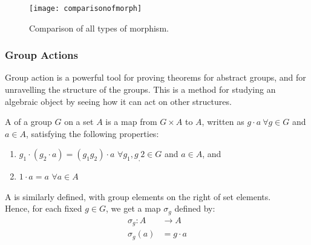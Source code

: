 \begin{figure}[H]
\centering
\texttt{[image: comparisonofmorph]}
\caption{Comparison of all types of morphism.}
\end{figure}

\subsubsection{Group Actions}

Group action is a powerful tool for proving theorems for abstract groups, and for unravelling the structure of the groups. This is a method for studying an algebraic object by seeing how it can act on other structures.

\begin{definition}
A  of a group $G$ on a set $A$ is a map from $G \times A$ to $A$, written as $g \cdot a \ \forall g\in G$ and $a\in A$, satisfying the following properties:
\begin{enumerate}[label=(\roman*)]
\setlength{\itemsep}{0pt}
\item $g_1 \cdot (g_2 \cdot a) = (g_1 g_2) \cdot a$ $\forall g_1, g_,2 \in G$ and $a \in A$, and
\item $1 \cdot a = a$ $\forall a \in A$
\end{enumerate}
A  is similarly defined, with group elements on the right of set elements.\\
Hence, for each fixed $g\in G$, we get a map $\sigma_g$ defined by:
\begin{align}
\sigma_g : A &\rightarrow A \nonumber \\
\sigma_g(a) &= g \cdot a \nonumber
\end{align}
\end{definition}

